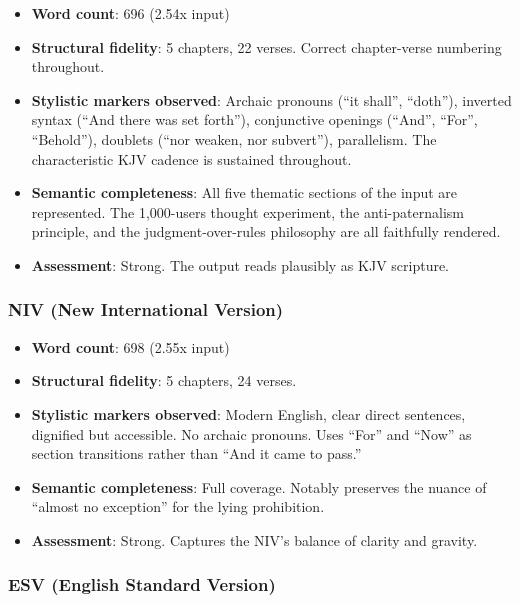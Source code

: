 \documentclass[10pt, letterpaper, twocolumn]{article}
\providecommand{\tightlist}{\setlength{\itemsep}{0pt}\setlength{\parskip}{0pt}}
\begin{document}
\begin{itemize}
\tightlist
\item
  \textbf{Word count}: 696 (2.54x input)
\item
  \textbf{Structural fidelity}: 5 chapters, 22 verses. Correct chapter-verse numbering throughout.
\item
  \textbf{Stylistic markers observed}: Archaic pronouns (``it shall'', ``doth''), inverted syntax (``And there was set forth''), conjunctive openings (``And'', ``For'', ``Behold''), doublets (``nor weaken, nor subvert''), parallelism. The characteristic KJV cadence is sustained throughout.
\item
  \textbf{Semantic completeness}: All five thematic sections of the input are represented. The 1,000-users thought experiment, the anti-paternalism principle, and the judgment-over-rules philosophy are all faithfully rendered.
\item
  \textbf{Assessment}: Strong. The output reads plausibly as KJV scripture.
\end{itemize}

\subsubsection*{NIV (New International Version)}\label{niv-new-international-version}

\begin{itemize}
\tightlist
\item
  \textbf{Word count}: 698 (2.55x input)
\item
  \textbf{Structural fidelity}: 5 chapters, 24 verses.
\item
  \textbf{Stylistic markers observed}: Modern English, clear direct sentences, dignified but accessible. No archaic pronouns. Uses ``For'' and ``Now'' as section transitions rather than ``And it came to pass.''
\item
  \textbf{Semantic completeness}: Full coverage. Notably preserves the nuance of ``almost no exception'' for the lying prohibition.
\item
  \textbf{Assessment}: Strong. Captures the NIV's balance of clarity and gravity.
\end{itemize}

\subsubsection*{ESV (English Standard Version)}\label{esv-english-standard-version}
\end{document}
